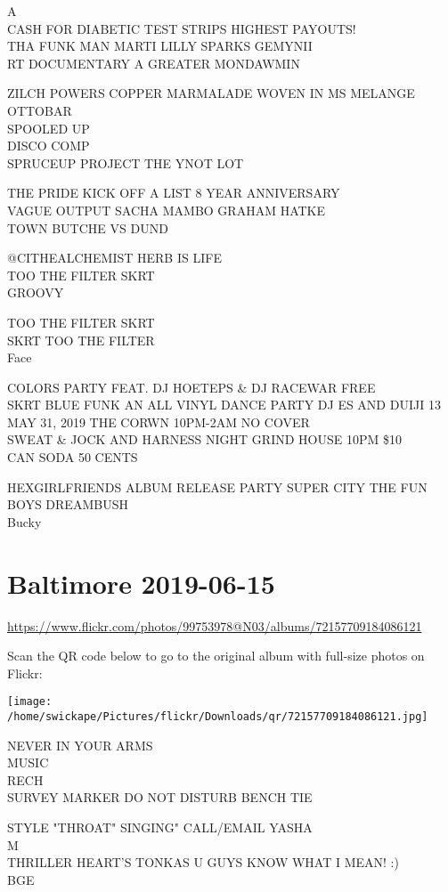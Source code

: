 \documentclass[10pt,letterpaper]{article}
\begin{document}
A\\
CASH FOR DIABETIC TEST STRIPS HIGHEST PAYOUTS!\\
THA FUNK MAN MARTI LILLY SPARKS GEMYNII\\
RT DOCUMENTARY A GREATER MONDAWMIN

ZILCH POWERS COPPER MARMALADE WOVEN IN MS MELANGE OTTOBAR\\
SPOOLED UP\\
DISCO COMP\\
SPRUCEUP PROJECT THE YNOT LOT

THE PRIDE KICK OFF A LIST 8 YEAR ANNIVERSARY\\
VAGUE OUTPUT SACHA MAMBO GRAHAM HATKE\\
TOWN BUTCHE VS DUND

@CITHEALCHEMIST HERB IS LIFE\\
TOO THE FILTER SKRT\\
GROOVY

TOO THE FILTER SKRT\\
SKRT TOO THE FILTER\\
Face

COLORS PARTY FEAT. DJ HOETEPS \& DJ RACEWAR FREE\\
SKRT BLUE FUNK AN ALL VINYL DANCE PARTY DJ ES AND DUIJI 13 MAY 31, 2019 THE CORWN 10PM{-}2AM NO COVER\\
SWEAT \& JOCK AND HARNESS NIGHT GRIND HOUSE 10PM \$10\\
CAN SODA 50 CENTS

HEXGIRLFRIENDS ALBUM RELEASE PARTY SUPER CITY THE FUN BOYS DREAMBUSH\\
Bucky


\section*{Baltimore 2019-06-15}

\url{https://www.flickr.com/photos/99753978@N03/albums/72157709184086121}

Scan the QR code below to go to the original album with full-size photos on Flickr:

\texttt{[image: /home/swickape/Pictures/flickr/Downloads/qr/72157709184086121.jpg]}


NEVER IN YOUR ARMS\\
MUSIC\\
RECH\\
SURVEY MARKER DO NOT DISTURB BENCH TIE

STYLE "THROAT" SINGING" CALL/EMAIL YASHA\\
M\\
THRILLER HEART'S TONKAS U GUYS KNOW WHAT I MEAN!  :)\\
BGE
\end{document}
